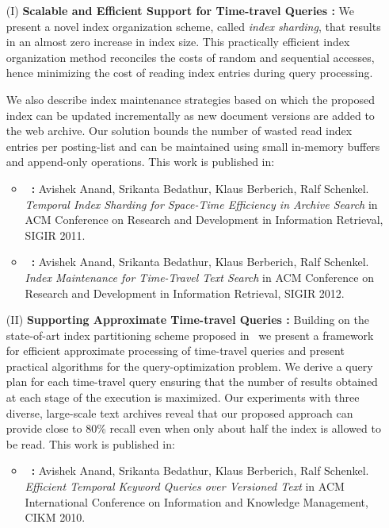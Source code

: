 \begin{enumerate}

\item[(I)]\textbf{Scalable and Efficient Support for Time-travel Queries : } We present a novel index organization scheme, called \emph{index sharding}, that results in an almost zero increase in index size.  This practically efficient index organization method reconciles the costs of random and sequential accesses, hence minimizing the cost of reading index entries during query processing.

We also describe index maintenance strategies based on which the proposed index can be updated incrementally as new document versions are added to the web archive. Our solution bounds the number of wasted read index entries per posting-list and can be maintained using small in-memory buffers and append-only operations. This work is published in:

\begin{itemize}
	\item{\textbf{~\cite{aanand:sigir2011}: }} 
		Avishek Anand, Srikanta Bedathur, Klaus Berberich, Ralf Schenkel.
		\emph{Temporal Index Sharding for Space-Time Efficiency in Archive Search}
		in ACM Conference on Research and Development in Information Retrieval, SIGIR 2011.

	\item{\textbf{~\cite{aanand:sigir2012}: }} 
		Avishek Anand, Srikanta Bedathur, Klaus Berberich, Ralf Schenkel.
		\emph{Index Maintenance for Time-Travel Text Search}
		in ACM Conference on Research and Development in Information Retrieval, SIGIR 2012.

\end{itemize}

\item[(II)]\textbf{Supporting Approximate Time-travel Queries : } Building on the state-of-art index partitioning scheme proposed in~\cite{kberberi:sigir2007} we present a framework for efficient approximate processing of time-travel queries and present practical algorithms for the query-optimization problem. We derive a query plan for each time-travel query ensuring that the number of results obtained at each stage of the execution is maximized. Our experiments with three diverse, large-scale text archives reveal that our proposed approach can provide close to 80\% recall even when only about half the index is allowed to be read. This work is published in:
	
\begin{itemize}
	\item{\textbf{~\cite{aanand:cikm2010}: }} 
		Avishek Anand, Srikanta Bedathur, Klaus Berberich, Ralf Schenkel.
		\emph{Efficient Temporal Keyword Queries over Versioned Text}
		in ACM International Conference on Information and 
Knowledge Management, CIKM 2010.
\end{itemize}
	

\end{enumerate}
